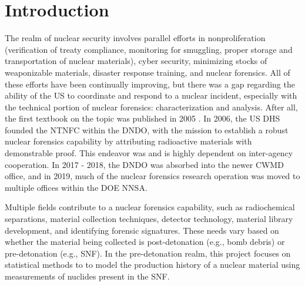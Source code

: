 \chapter{Introduction}
\label{ch:intro}

The realm of nuclear security involves parallel efforts in nonproliferation
(verification of treaty compliance, monitoring for smuggling, proper storage and
transportation of nuclear materials), cyber security, minimizing stocks of
weaponizable materials, disaster response training, and nuclear forensics. All
of these efforts have been continually improving, but there was a gap regarding
the ability of the \gls{US} to coordinate and respond to a nuclear incident,
especially with the technical portion of nuclear forensics: characterization and
analysis. After all, the first textbook on the topic was published in 2005
\cite{nftext_2005}. In 2006, the \gls{US} \gls{DHS} founded the \gls{NTNFC}
within the \gls{DNDO}, with the mission to establish a robust nuclear forensics
capability by attributing radioactive materials with demonstrable proof. This
endeavor was and is highly dependent on inter-agency cooperation. In 2017 \--
2018, the \gls{DNDO} was absorbed into the newer \gls{CWMD} office, and in 2019,
much of the nuclear forensics research operation was moved to multiple offices
within the \gls{DOE} \gls{NNSA}. 

Multiple fields contribute to a nuclear forensics capability, such as
radiochemical separations, material collection techniques, detector technology,
material library development, and identifying forensic signatures. These needs
vary based on whether the material being collected is post-detonation (e.g.,
bomb debris) or pre-detonation (e.g., \gls{SNF}).  In the
pre-detonation realm, this project focuses on statistical methods to to model
the production history of a nuclear material using measurements of nuclides
present in the \gls{SNF}.

